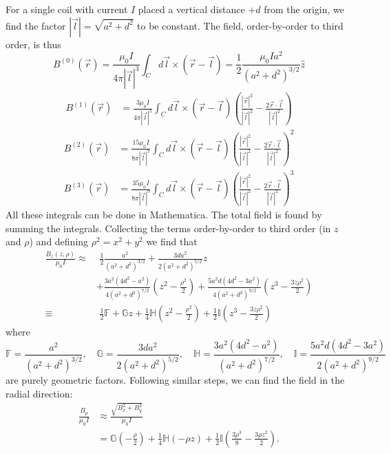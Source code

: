 \documentclass{article}
\theoremstyle{definition}
\newcommand{\f}[2]{\frac{#1}{#2}}
\newcommand{\lp}{\left(}
\newcommand{\rp}{\right)}
\begin{document}
For a single coil with current $I$ placed a vertical distance $+d$ from the origin, we find the factor $|\vec{l}| = \sqrt{a^2 + d^2}$ to be constant. The field, order-by-order to third order, is thus  
\begin{equation*}
B^{(0)}(\vec{r}) = \f{\mu_0 I}{4\pi |\vec{l}|^3}\int_C d\vec{l}\times (\vec{r} - \vec{l}) = \f{1}{2}\f{\mu_0 I a^2}{(a^2 + d^2)^{3/2}} \hat{z}
\end{equation*}
\begin{align*}
B^{(1)}(\vec{r}) 
&= \f{3\mu_0 I}{4\pi |\vec{l}|^5}\int_C d\vec{l}\times (\vec{r} - \vec{l}) \lp \f{|\vec{r}|^2}{|\vec{l}|^2} - \f{2\vec{r}\cdot\vec{l}}{|\vec{l}|^2} \rp
\end{align*}
\begin{align*}
B^{(2)}(\vec{r}) 
&= \f{15\mu_0 I}{8\pi |\vec{l}|^7}\int_C d\vec{l}\times (\vec{r} - \vec{l}) \lp \f{|\vec{r}|^2}{|\vec{l}|^2} - \f{2\vec{r}\cdot\vec{l}}{|\vec{l}|^2} \rp^2
\end{align*}
\begin{align*}
B^{(3)}(\vec{r}) &= \f{35\mu_0 I}{8\pi |\vec{l}|^9}\int_C d\vec{l}\times (\vec{r} - \vec{l}) \lp \f{|\vec{r}|^2}{|\vec{l}|^2} - \f{2\vec{r}\cdot\vec{l}}{|\vec{l}|^2} \rp^3
\end{align*}
All these integrals can be done in Mathematica. The total field is found by summing the integrals. Collecting the terms order-by-order to third order (in $z$ and $\rho$) and defining $\rho^2 = x^2 + y^2$ we find that
\begin{align*}
\f{B_z(z,\rho)}{\mu_0 I} \approx &\,\,\f{1}{2}\f{a^2}{(a^2+d^2)^{3/2}} + \f{3da^2}{2(a^2+d^2)^{5/2}}z 
\\
&+ \f{3a^2(4d^2 - a^2)}{4(a^2+d^2)^{7/2}} \lp z^2 - \f{\rho^2}{2} \rp
+\f{5 a^2 d (4d^2 - 3 a^2)}{4 (a^2 + d^2)^{9/2}}\lp z^3 - \f{3 z\rho^2}{2}\rp\\
\equiv&\,\, \f{1}{2}\mathbb{F} + \mathbb{G}z + \f{1}{4}\mathbb{H}\lp z^2 - \f{\rho^2}{2} \rp + \f{1}{2} \mathbb{I}\lp z^3 - \f{3 z\rho^2}{2}\rp
\end{align*}
where 
\begin{equation*}
\mathbb{F} = \f{a^2}{(a^2+d^2)^{3/2}}, \quad 
\mathbb{G} = \f{3da^2}{2(a^2+d^2)^{5/2}}, \quad 
\mathbb{H} = \f{3a^2(4d^2-a^2)}{(a^2+d^2)^{7/2}},\quad
\mathbb{I} = \f{5 a^2 d (4 d^2-3a^2)}{2(a^2 + d^2)^{9/2}} 
\end{equation*}
are purely geometric factors. Following similar steps, we can find the field in the radial direction:
\begin{align*}
\f{B_\rho}{\mu_0 I} 
&\approx \f{\sqrt{B_x^2 + B_y^2}}{\mu_0 I} \\
&= \mathbb{G}\lp -\f{\rho}{2} \rp + \f{1}{4}\mathbb{H}(-\rho z) + \f{1}{2}\mathbb{I}\lp \f{3\rho^3}{8} - \f{3\rho z^2}{2} \rp.
\end{align*}
\end{document}
